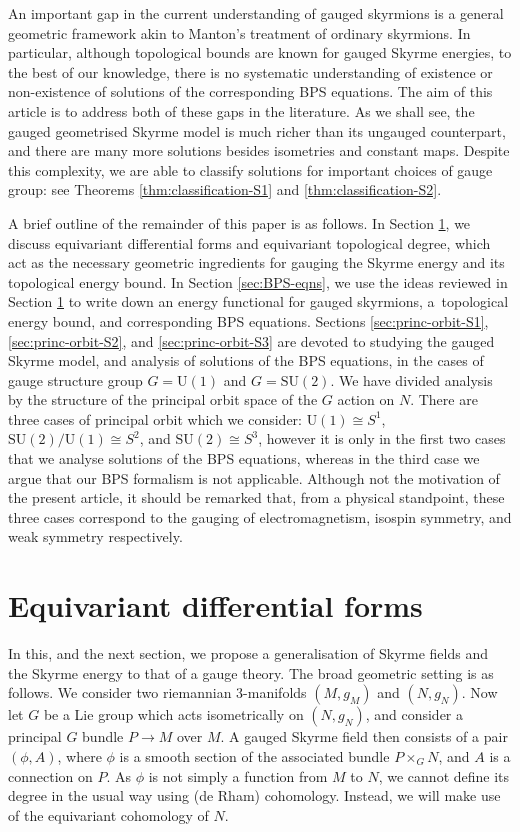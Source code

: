 \documentclass[10pt,a4paper]{amsart}
\newcommand{\SU}{{\mathrm{SU}}}
\newcommand{\U}{{\mathrm{U}}}
\newcommand{\1}{{\mathbb{1}}}
\numberwithin{equation}{section}
\begin{document}
An important gap in the current understanding of gauged skyrmions is a general geometric framework akin to Manton's treatment of ordinary skyrmions. In particular, although topological bounds are known for gauged Skyrme energies, to the best of our knowledge, there is no systematic understanding of existence or non-existence of solutions of the corresponding BPS equations. The aim of this article is to address both of these gaps in the literature. As we shall see, the gauged geometrised Skyrme model is much richer than its ungauged counterpart, and there are many more solutions besides isometries and constant maps. Despite this complexity, we are able to classify solutions for important choices of gauge group: see Theorems \ref{thm:classification-S1} and \ref{thm:classification-S2}.

A brief outline of the remainder of this paper is as follows. In Section \ref{sec:geometry-gauged-sky}, we discuss equivariant differential forms and equivariant topological degree, which act as the necessary geometric ingredients for gauging the Skyrme energy and its topological energy bound. In Section \ref{sec:BPS-eqns}, we use the ideas reviewed in Section \ref{sec:geometry-gauged-sky} to write down an energy functional for gauged skyrmions, a~topological energy bound, and corresponding BPS equations. Sections \ref{sec:princ-orbit-S1}, \ref{sec:princ-orbit-S2}, and \ref{sec:princ-orbit-S3} are devoted to studying the gauged Skyrme model, and analysis of solutions of the BPS equations, in the cases of gauge structure group $G=\U(1)$ and $G=\SU(2)$. We have divided analysis by the structure of the principal orbit space of the $G$ action on $N$. There are three cases of principal orbit which we consider: $\U(1)\cong S^1$, $\SU(2)/\U(1) \cong S^2$, and $\SU(2)\cong S^3$, however it is only in the first two cases that we analyse solutions of the BPS equations, whereas in the third case we argue that our BPS formalism is not applicable. Although not the motivation of the present article, it should be remarked that, from a physical standpoint, these three cases correspond to the gauging of electromagnetism, isospin symmetry, and weak symmetry respectively.
\section{Equivariant differential forms}\label{sec:geometry-gauged-sky}
In this, and the next section, we propose a generalisation of Skyrme fields and the Skyrme energy to that of a gauge theory. The broad geometric setting is as follows. We consider two riemannian 3-manifolds $(M,g_M)$ and $(N,g_N)$. Now let $G$ be a Lie group which acts isometrically on $(N,g_N)$, and consider a principal $G$ bundle $P\to M$ over $M$. A gauged Skyrme field then consists of a pair $(\phi,A)$, where $\phi$ is a smooth section of the associated bundle $P\times_GN$, and $A$ is a connection on $P$. As $\phi$ is not simply a function from $M$ to $N$, we cannot define its degree in the usual way using (de Rham) cohomology. Instead, we will make use of the equivariant cohomology of $N$.
\end{document}

